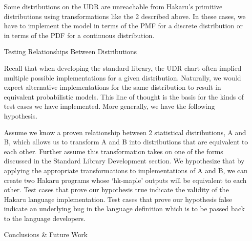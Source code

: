 \documentclass[22pt]{beamer}
\newenvironment{variableblock}[3]{%
  \setbeamercolor{block body}{#2}
  \setbeamercolor{block title}{#3}
  \begin{block}{#1}}{\end{block}}
\begin{document}
\begin{frame}[fragile]
\begin{textblock}{5}
\begin{variableblock}{}{}{}
\bigskip

\scriptsize{Some distributions on the UDR are unreachable from Hakaru's primitive distributions using transformations like the 2 described above. In these cases, we have to implement the model in terms of the PMF for a discrete distribution or in terms of the PDF for a continuous distribution.}


\end{variableblock}


\begin{block}{\Large{Testing Relationships Between Distributions}}
\justifying

\scriptsize{Recall that when developing the standard library, the UDR chart often implied multiple possible implementations for a given distribution. Naturally, we would expect alternative implementations for the same distribution to result in equivalent probabilistic models. This line of thought is the basis for the kinds of test cases we have implemented. More generally, we have the following hypothesis.}

\bigskip

\scriptsize{Assume we know a proven relationship between 2 statistical distributions, A and B, which allows us to transform A and B into distributions that are equivalent to each other. Further assume this transformation takes on one of the forms discussed in the Standard Library Development section. We hypothesize that by applying the appropriate transformations to implementations of A and B, we can create two Hakaru programs whose `hk-maple' outputs will be equivalent to each other. Test cases that prove our hypothesis true indicate the validity of the Hakaru language implementation. Test cases that prove our hypothesis false indicate an underlying bug in the language definition which is to be passed back to the language developers.
}

\end{block}


\begin{block}{\Large{Conclusions \& Future Work}}


\end{block}
\end{textblock}
\end{frame}
\end{document}
